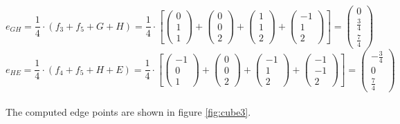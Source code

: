 \documentclass{article}
\begin{document}
\[e_{GH}=\frac{1}{4}\cdot(f_3+f_5+G+H)=\frac{1}{4}\cdot\left[
\left({\begin{array}{c} 0 \\  1 \\ 1 \end{array}}\right)+
\left({\begin{array}{c} 0 \\ 0 \\ 2 \end{array}}\right)+
\left({\begin{array}{c} 1 \\ 1 \\ 2 \end{array}}\right)+
\left({\begin{array}{c} -1 \\  1 \\ 2 \end{array}}\right)\right]=
\left({\begin{array}{c}  0 \\ \frac{3}{4} \\ \frac{7}{4} \end{array}}\right)
\]
\[e_{HE}=\frac{1}{4}\cdot(f_4+f_5+H+E)=\frac{1}{4}\cdot\left[
\left({\begin{array}{c} -1 \\  0 \\ 1 \end{array}}\right)+
\left({\begin{array}{c} 0 \\ 0 \\ 2 \end{array}}\right)+
\left({\begin{array}{c} -1 \\ 1 \\ 2 \end{array}}\right)+
\left({\begin{array}{c} -1 \\  -1 \\ 2 \end{array}}\right)\right]=
\left({\begin{array}{c}  -\frac{3}{4} \\ 0 \\ \frac{7}{4} \end{array}}\right)
\]
\\
The computed edge points are shown in figure \ref{fig:cube3}.
\end{document}
